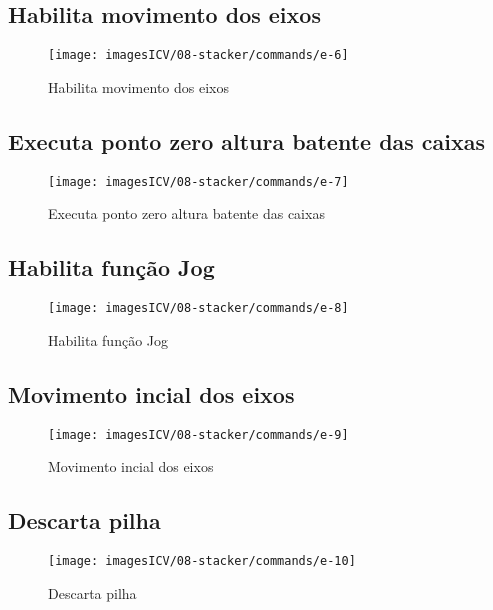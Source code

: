 \thispagestyle{fancy}
\vspace{\fill}
\subsection{\small Habilita movimento dos eixos}
\begin{figure}
    \centering
    \texttt{[image: imagesICV/08-stacker/commands/e-6]}
    \caption{Habilita movimento dos eixos}
\end{figure}
\newpage

\thispagestyle{fancy}
\vspace{\fill}
\subsection{\small Executa ponto zero altura batente das caixas}
\begin{figure}
    \centering
    \texttt{[image: imagesICV/08-stacker/commands/e-7]}
    \caption{Executa ponto zero altura batente das caixas}
\end{figure}
\newpage

\thispagestyle{fancy}
\vspace{\fill}
\subsection{\small Habilita função Jog}
\begin{figure}
    \centering
    \texttt{[image: imagesICV/08-stacker/commands/e-8]}
    \caption{Habilita função Jog}
\end{figure}
\newpage

\thispagestyle{fancy}
\vspace{\fill}
\subsection{\small Movimento incial dos eixos}
\begin{figure}
    \centering
    \texttt{[image: imagesICV/08-stacker/commands/e-9]}
    \caption{Movimento incial dos eixos}
\end{figure}
\newpage

\thispagestyle{fancy}
\vspace{\fill}
\subsection{\small Descarta pilha}
\begin{figure}
    \centering
    \texttt{[image: imagesICV/08-stacker/commands/e-10]}
    \caption{Descarta pilha}
\end{figure}
\newpage

